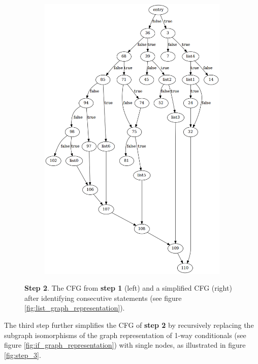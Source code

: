 \begin{figure}[htbp]
\begin{subfigure}[t]{0.45\textwidth}
	\end{subfigure}
	\qquad
	\begin{subfigure}[t]{0.45\textwidth}
		\includegraphics[width=\textwidth]{appendices/control_flow_analysis_example/stmt_2.png}
	\end{subfigure}
	\caption{\textbf{Step 2}. The CFG from \textbf{step 1} (left) and a simplified CFG (right) after identifying consecutive statements (see figure \ref{fig:list_graph_representation}).}
	\label{fig:step_2}
\end{figure}

The third step further simplifies the CFG of \textbf{step 2} by recursively replacing the subgraph isomorphisms of the graph representation of 1-way conditionals (see figure \ref{fig:if_graph_representation}) with single nodes, as illustrated in figure \ref{fig:step_3}.

